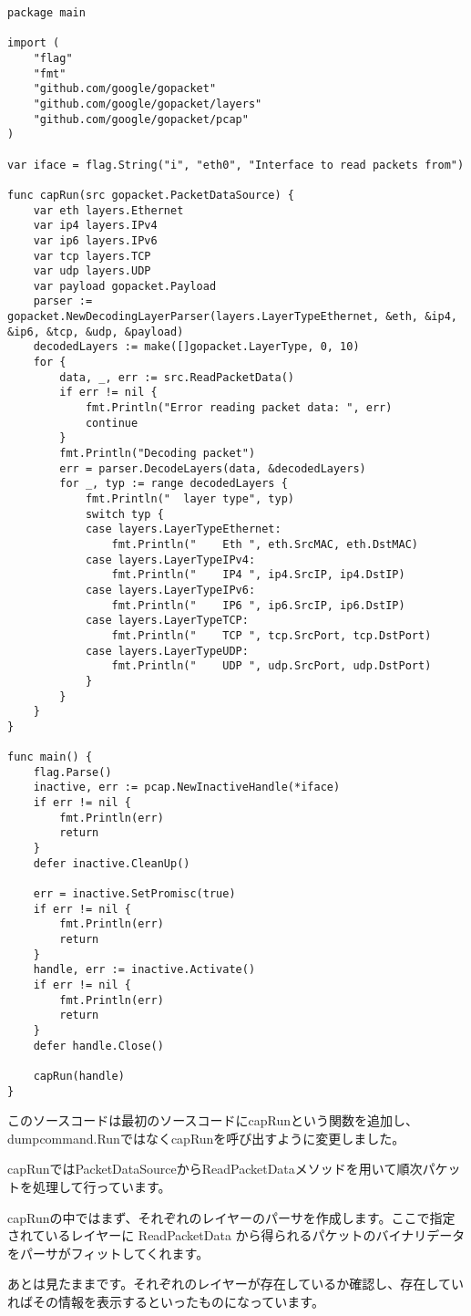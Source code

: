 \begin{lstlisting}
package main

import (
	"flag"
	"fmt"
	"github.com/google/gopacket"
	"github.com/google/gopacket/layers"
	"github.com/google/gopacket/pcap"
)

var iface = flag.String("i", "eth0", "Interface to read packets from")

func capRun(src gopacket.PacketDataSource) {
	var eth layers.Ethernet
	var ip4 layers.IPv4
	var ip6 layers.IPv6
	var tcp layers.TCP
	var udp layers.UDP
	var payload gopacket.Payload
	parser := gopacket.NewDecodingLayerParser(layers.LayerTypeEthernet, &eth, &ip4, &ip6, &tcp, &udp, &payload)
	decodedLayers := make([]gopacket.LayerType, 0, 10)
	for {
		data, _, err := src.ReadPacketData()
		if err != nil {
			fmt.Println("Error reading packet data: ", err)
			continue
		}
		fmt.Println("Decoding packet")
		err = parser.DecodeLayers(data, &decodedLayers)
		for _, typ := range decodedLayers {
			fmt.Println("  layer type", typ)
			switch typ {
			case layers.LayerTypeEthernet:
				fmt.Println("    Eth ", eth.SrcMAC, eth.DstMAC)
			case layers.LayerTypeIPv4:
				fmt.Println("    IP4 ", ip4.SrcIP, ip4.DstIP)
			case layers.LayerTypeIPv6:
				fmt.Println("    IP6 ", ip6.SrcIP, ip6.DstIP)
			case layers.LayerTypeTCP:
				fmt.Println("    TCP ", tcp.SrcPort, tcp.DstPort)
			case layers.LayerTypeUDP:
				fmt.Println("    UDP ", udp.SrcPort, udp.DstPort)
			}
		}
	}
}

func main() {
	flag.Parse()
	inactive, err := pcap.NewInactiveHandle(*iface)
	if err != nil {
		fmt.Println(err)
		return
	}
	defer inactive.CleanUp()

	err = inactive.SetPromisc(true)
	if err != nil {
		fmt.Println(err)
		return
	}
	handle, err := inactive.Activate()
	if err != nil {
		fmt.Println(err)
		return
	}
	defer handle.Close()

	capRun(handle)
}
\end{lstlisting}

このソースコードは最初のソースコードにcapRunという関数を追加し、dumpcommand.RunではなくcapRunを呼び出すように変更しました。

capRunではPacketDataSourceからReadPacketDataメソッドを用いて順次パケットを処理して行っています。

capRunの中ではまず、それぞれのレイヤーのパーサを作成します。ここで指定されているレイヤーに ReadPacketData から得られるパケットのバイナリデータをパーサがフィットしてくれます。

あとは見たままです。それぞれのレイヤーが存在しているか確認し、存在していればその情報を表示するといったものになっています。

